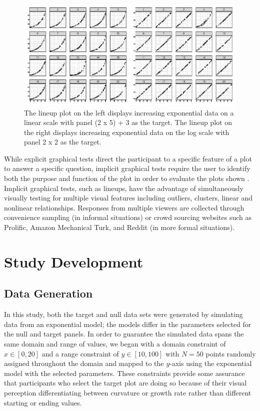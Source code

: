 \documentclass[12pt]{article}
\begin{document}
\begin{figure}[tbp]

{\centering \includegraphics[width=\linewidth,]{logarithmic-lineups_files/figure-latex/lineup-example-1} 

}

\caption[Lineup examples]{The lineup plot on the left displays increasing exponential data on a linear scale with panel (2 x 5) + 3 as the target. The lineup plot on the right displays increasing exponential data on the log scale with panel 2 x 2 as the target.}\label{fig:lineup-example}
\end{figure}

While explicit graphical tests direct the participant to a specific
feature of a plot to answer a specific question, implicit graphical
tests require the user to identify both the purpose and function of the
plot in order to evaluate the plots shown
\citep{vanderplas_testing_2020}. Implicit graphical tests, such as
lineups, have the advantage of simultaneously visually testing for
multiple visual features including outliers, clusters, linear and
nonlinear relationships. Responses from multiple viewers are collected
through convenience sampling (in informal situations) or crowd sourcing
websites such as Prolific, Amazon Mechanical Turk, and Reddit (in more
formal situations).

\hypertarget{study-development}{%
\section{Study Development}\label{study-development}}

\hypertarget{data-generation}{%
\subsection{Data Generation}\label{data-generation}}

In this study, both the target and null data sets were generated by
simulating data from an exponential model; the models differ in the
parameters selected for the null and target panels. In order to
guarantee the simulated data spans the same domain and range of values,
we began with a domain constraint of \(x\in [0,20]\) and a range
constraint of \(y\in [10,100]\) with \(N = 50\) points randomly assigned
throughout the domain and mapped to the \(y\)-axis using the exponential
model with the selected parameters. These constraints provide some
assurance that participants who select the target plot are doing so
because of their visual perception differentiating between curvature or
growth rate rather than different starting or ending values.
\end{document}
